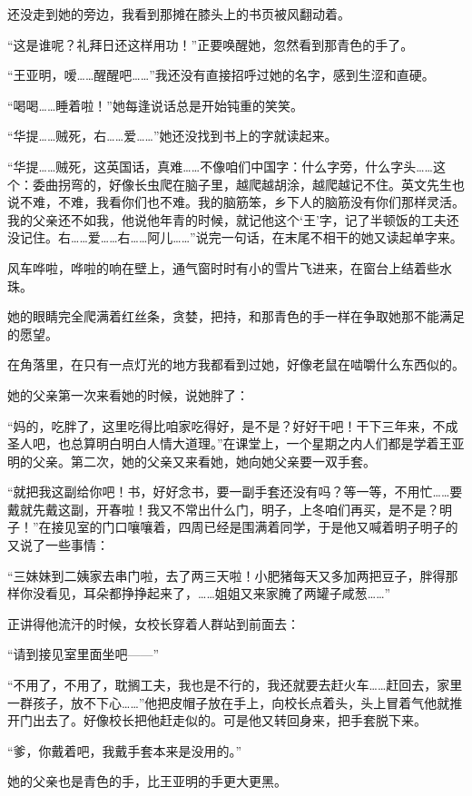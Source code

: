 \par 还没走到她的旁边，我看到那摊在膝头上的书页被风翻动着。
\par “这是谁呢？礼拜日还这样用功！”正要唤醒她，忽然看到那青色的手了。
\par “王亚明，嗳……醒醒吧……”我还没有直接招呼过她的名字，感到生涩和直硬。
\par “喝喝……睡着啦！”她每逢说话总是开始钝重的笑笑。
\par “华提……贼死，右……爱……”她还没找到书上的字就读起来。
\par “华提……贼死，这英国话，真难……不像咱们中国字：什么字旁，什么字头……这个：委曲拐弯的，好像长虫爬在脑子里，越爬越胡涂，越爬越记不住。英文先生也说不难，不难，我看你们也不难。我的脑筋笨，乡下人的脑筋没有你们那样灵活。我的父亲还不如我，他说他年青的时候，就记他这个‘王’字，记了半顿饭的工夫还没记住。右……爱……右……阿儿……”说完一句话，在末尾不相干的她又读起单字来。
\par 风车哗啦，哗啦的响在壁上，通气窗时时有小的雪片飞进来，在窗台上结着些水珠。
\par 她的眼睛完全爬满着红丝条，贪婪，把持，和那青色的手一样在争取她那不能满足的愿望。
\par 在角落里，在只有一点灯光的地方我都看到过她，好像老鼠在啮嚼什么东西似的。
\par 她的父亲第一次来看她的时候，说她胖了：
\par “妈的，吃胖了，这里吃得比咱家吃得好，是不是？好好干吧！干下三年来，不成圣人吧，也总算明白明白人情大道理。”在课堂上，一个星期之内人们都是学着王亚明的父亲。第二次，她的父亲又来看她，她向她父亲要一双手套。
\par “就把我这副给你吧！书，好好念书，要一副手套还没有吗？等一等，不用忙……要戴就先戴这副，开春啦！我又不常出什么门，明子，上冬咱们再买，是不是？明子！”在接见室的门口嚷嚷着，四周已经是围满着同学，于是他又喊着明子明子的又说了一些事情：
\par “三妹妹到二姨家去串门啦，去了两三天啦！小肥猪每天又多加两把豆子，胖得那样你没看见，耳朵都挣挣起来了，……姐姐又来家腌了两罐子咸葱……”
\par 正讲得他流汗的时候，女校长穿着人群站到前面去：
\par “请到接见室里面坐吧——”
\par “不用了，不用了，耽搁工夫，我也是不行的，我还就要去赶火车……赶回去，家里一群孩子，放不下心……”他把皮帽子放在手上，向校长点着头，头上冒着气他就推开门出去了。好像校长把他赶走似的。可是他又转回身来，把手套脱下来。
\par “爹，你戴着吧，我戴手套本来是没用的。”
\par 她的父亲也是青色的手，比王亚明的手更大更黑。
